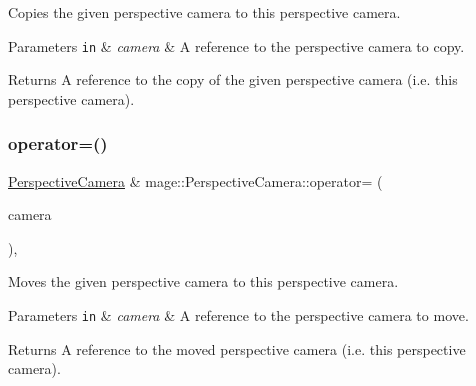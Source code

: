 Copies the given perspective camera to this perspective camera.


\begin{DoxyParams}[1]{Parameters}
\mbox{\tt in}  & {\em camera} & A reference to the perspective camera to copy. \\
\hline
\end{DoxyParams}
\begin{DoxyReturn}{Returns}
A reference to the copy of the given perspective camera (i.\+e. this perspective camera). 
\end{DoxyReturn}
\hypertarget{classmage_1_1_perspective_camera_a2b69eb0ecc802dd0c5e3c386541a48f6}{}\label{classmage_1_1_perspective_camera_a2b69eb0ecc802dd0c5e3c386541a48f6} 
\subsubsection{\texorpdfstring{operator=()}{operator=()}\hspace{0.1cm}{\footnotesize\ttfamily [2/2]}}
{\footnotesize\ttfamily \hyperlink{classmage_1_1_perspective_camera}{Perspective\+Camera} \& mage\+::\+Perspective\+Camera\+::operator= (\begin{DoxyParamCaption}\item[{\hyperlink{classmage_1_1_perspective_camera}{Perspective\+Camera} \&\&}]{camera }\end{DoxyParamCaption})\hspace{0.3cm}{\ttfamily [default]}, {\ttfamily [noexcept]}}

Moves the given perspective camera to this perspective camera.


\begin{DoxyParams}[1]{Parameters}
\mbox{\tt in}  & {\em camera} & A reference to the perspective camera to move. \\
\hline
\end{DoxyParams}
\begin{DoxyReturn}{Returns}
A reference to the moved perspective camera (i.\+e. this perspective camera). 
\end{DoxyReturn}
\hypertarget{classmage_1_1_perspective_camera_a60fda2d54481a0f4c04fe8a08a8d729b}{}\label{classmage_1_1_perspective_camera_a60fda2d54481a0f4c04fe8a08a8d729b} 
